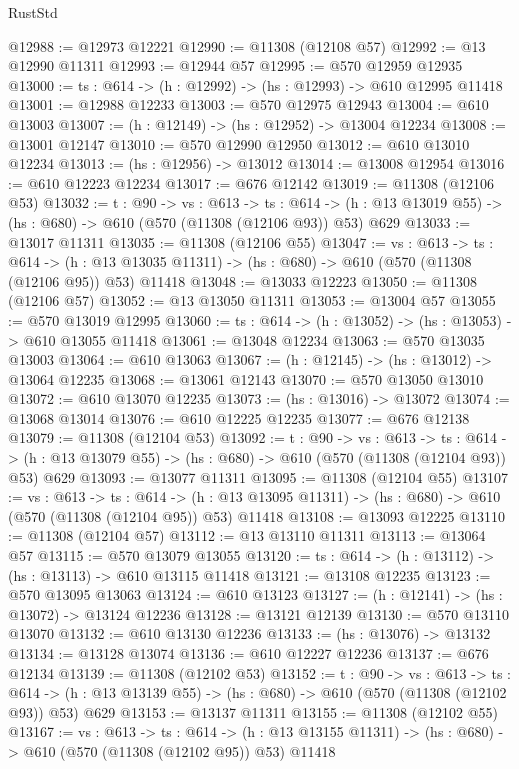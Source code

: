 \begin{lexlean}{RustStd}
\begin{coremodule}
@12988 := @12973 @12221
@12990 := @11308 (@12108 @57)
@12992 := @13 @12990 @11311
@12993 := @12944 @57
@12995 := @570 @12959 @12935
@13000 := {ts : @614} -> (h : @12992) -> (hs : @12993) -> @610 @12995 @11418
@13001 := @12988 @12233
@13003 := @570 @12975 @12943
@13004 := @610 @13003
@13007 := (h : @12149) -> (hs : @12952) -> @13004 @12234
@13008 := @13001 @12147
@13010 := @570 @12990 @12950
@13012 := @610 @13010 @12234
@13013 := (hs : @12956) -> @13012
@13014 := @13008 @12954
@13016 := @610 @12223 @12234
@13017 := @676 @12142
@13019 := @11308 (@12106 @53)
@13032 := {t : @90} ->
  {vs : @613} ->
  {ts : @614} -> (h : @13 @13019 @55) -> (hs : @680) -> @610 (@570 (@11308 (@12106 @93)) @53) @629
@13033 := @13017 @11311
@13035 := @11308 (@12106 @55)
@13047 := {vs : @613} ->
  {ts : @614} ->
  (h : @13 @13035 @11311) -> (hs : @680) -> @610 (@570 (@11308 (@12106 @95)) @53) @11418
@13048 := @13033 @12223
@13050 := @11308 (@12106 @57)
@13052 := @13 @13050 @11311
@13053 := @13004 @57
@13055 := @570 @13019 @12995
@13060 := {ts : @614} -> (h : @13052) -> (hs : @13053) -> @610 @13055 @11418
@13061 := @13048 @12234
@13063 := @570 @13035 @13003
@13064 := @610 @13063
@13067 := (h : @12145) -> (hs : @13012) -> @13064 @12235
@13068 := @13061 @12143
@13070 := @570 @13050 @13010
@13072 := @610 @13070 @12235
@13073 := (hs : @13016) -> @13072
@13074 := @13068 @13014
@13076 := @610 @12225 @12235
@13077 := @676 @12138
@13079 := @11308 (@12104 @53)
@13092 := {t : @90} ->
  {vs : @613} ->
  {ts : @614} -> (h : @13 @13079 @55) -> (hs : @680) -> @610 (@570 (@11308 (@12104 @93)) @53) @629
@13093 := @13077 @11311
@13095 := @11308 (@12104 @55)
@13107 := {vs : @613} ->
  {ts : @614} ->
  (h : @13 @13095 @11311) -> (hs : @680) -> @610 (@570 (@11308 (@12104 @95)) @53) @11418
@13108 := @13093 @12225
@13110 := @11308 (@12104 @57)
@13112 := @13 @13110 @11311
@13113 := @13064 @57
@13115 := @570 @13079 @13055
@13120 := {ts : @614} -> (h : @13112) -> (hs : @13113) -> @610 @13115 @11418
@13121 := @13108 @12235
@13123 := @570 @13095 @13063
@13124 := @610 @13123
@13127 := (h : @12141) -> (hs : @13072) -> @13124 @12236
@13128 := @13121 @12139
@13130 := @570 @13110 @13070
@13132 := @610 @13130 @12236
@13133 := (hs : @13076) -> @13132
@13134 := @13128 @13074
@13136 := @610 @12227 @12236
@13137 := @676 @12134
@13139 := @11308 (@12102 @53)
@13152 := {t : @90} ->
  {vs : @613} ->
  {ts : @614} -> (h : @13 @13139 @55) -> (hs : @680) -> @610 (@570 (@11308 (@12102 @93)) @53) @629
@13153 := @13137 @11311
@13155 := @11308 (@12102 @55)
@13167 := {vs : @613} ->
  {ts : @614} ->
  (h : @13 @13155 @11311) -> (hs : @680) -> @610 (@570 (@11308 (@12102 @95)) @53) @11418

\end{coremodule}
\end{lexlean}

